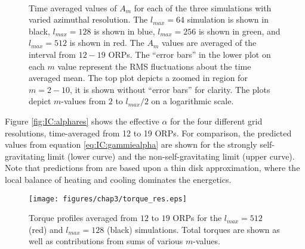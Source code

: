 \begin{figure}[p]
\centering
{}\\
\caption[$\left<A_m\right>$ values for the comparison of azimuthal resolution]{Time averaged values of $A_m$ for each of the three simulations with varied azimuthal resolution. The $l_{max} =64$ simulation is shown in black, $l_{max} =128$ is shown in blue, $l_{max} = 256$ is shown in green, and $l_{max} =512$ is shown in red. The $A_m$ values are averaged of the interval from $12-19$ ORPs. The ``error bars'' in the lower plot on each $m$ value represent the RMS fluctuations about the time averaged mean. The top plot depicts a zoomed in region for $m = 2-10$, it is shown without ``error bars'' for clarity. The plots depict $m$-values from $2$ to $l_{max}/2$ on a logarithmic scale.}
\label{fig:IC:Amres}
\end{figure}

Figure \ref{fig:IC:alphares} shows the effective $\alpha$ for the four different grid resolutions, time-averaged from 12 to 19 ORPs.  For comparison, the predicted values from  equation \eqref{eq:IC:gammiealpha} are shown for the strongly self-gravitating limit (lower curve) and the non-self-gravitating limit (upper curve).   Note that predictions from \citet{gammie2001} are based upon a thin disk approximation, where the local balance of heating and cooling dominates the energetics.

\begin{figure}[p]
\centering
\texttt{[image: figures/chap3/torque\_res.eps]}
\caption[Comparison of $l_{max} = 128$ and 512 run asymptotic torque profiles.]{Torque profiles averaged from $12$ to $19$ ORPs for the $l_{max} =512$ (red) and $l_{max} =128$ (black) simulations. Total torques are shown as well as contributions from sums of various $m$-values.}
\label{fig:IC:torqueres}
\end{figure} 

